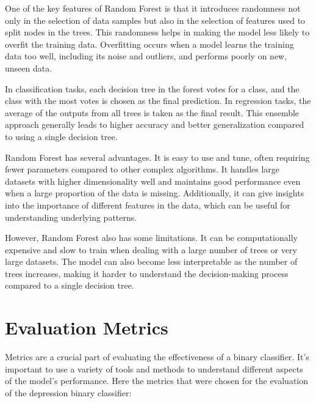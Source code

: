 One of the key features of Random Forest is that it introduces randomness not only in the selection of data samples but also in the selection of features used to split nodes in the trees. This randomness helps in making the model less likely to overfit the training data. Overfitting occurs when a model learns the training data too well, including its noise and outliers, and performs poorly on new, unseen data.

In classification tasks, each decision tree in the forest votes for a class, and the class with the most votes is chosen as the final prediction. In regression tasks, the average of the outputs from all trees is taken as the final result. This ensemble approach generally leads to higher accuracy and better generalization compared to using a single decision tree.

Random Forest has several advantages. It is easy to use and tune, often requiring fewer parameters compared to other complex algorithms. It handles large datasets with higher dimensionality well and maintains good performance even when a large proportion of the data is missing. Additionally, it can give insights into the importance of different features in the data, which can be useful for understanding underlying patterns.

However, Random Forest also has some limitations. It can be computationally expensive and slow to train when dealing with a large number of trees or very large datasets. The model can also become less interpretable as the number of trees increases, making it harder to understand the decision-making process compared to a single decision tree.

\section{Evaluation Metrics}
\quad Metrics are a crucial part of evaluating the effectiveness of a binary classifier. It's important to use a variety of tools and methods to understand different aspects of the model's performance. Here the metrics that were chosen for the evaluation of the depression binary classifier:


